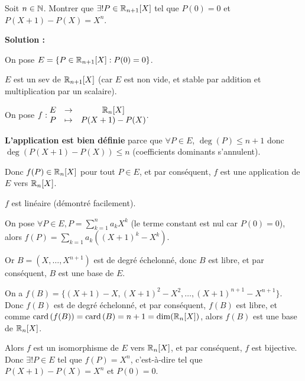 \documentclass[12pt, a4paper]{report}
\begin{document}
\begin{exercise}
    Soit $n \in \mathbb{N}$. Montrer que $\exists! P \in \mathbb{R}_{n+1}[X]$ tel que $P(0) = 0$ et $P(X+1) - P(X) = X^n$.

    \textbf{Solution :}

    On pose $E = \{P \in \mathbb{R}_{n+1}[X] : P(0) = 0\}$.

    $E$ est un sev de $\mathbb{R}_{n+1}[X]$ (car $E$ est non vide, et stable par addition et multiplication par un scalaire).

    On pose $f: \begin{matrix}
    E &\to &\mathbb{R}_n[X]\\
    P &\mapsto &P(X+1) - P(X)
    \end{matrix}$.

    \begin{outline}
        \1 \textbf{L'application est bien définie} parce que $\forall P \in E$, $\deg(P) \le n+1$ donc $\deg(P(X+1) - P(X)) \le n$ (coefficients dominants s'annulent).

        \1 Donc $f(P) \in \mathbb{R}_n[X]$ pour tout $P \in E$, et par conséquent, $f$ est une application de $E$ vers $\mathbb{R}_n[X]$.

        \1 $f$ est linéaire (démontré facilement).

        \1 On pose $\forall P \in E, P = \sum_{k=1}^n a_k X^k$ (le terme constant est nul car $P(0) = 0$), alors $f(P) = \sum_{k=1} a_k ((X+1)^k - X^k)$.

        \1 Or $B = (X,\dots,X^{n+1})$ est de degré échelonné, donc $B$ est libre, et par conséquent, $B$ est une base de $E$.

        \1 On a $f(B) = \{(X+1) - X, (X+1)^2 - X^2, \dots, (X+1)^{n+1} - X^{n+1}\}$. Donc $f(B)$ est de degré échelonné, et par conséquent, $f(B)$ est libre, et comme $\mathrm{card}\left(f(B)\right) = \mathrm{card}\left(B\right) = n+1 = \dim(\mathbb{R}_n[X])$, alors $f(B)$ est une base de $\mathbb{R}_n[X]$.

        \1 Alors $f$ est un isomorphisme de $E$ vers $\mathbb{R}_n[X]$, et par conséquent, $f$ est bijective. Donc $\exists! P \in E$ tel que $f(P) = X^n$, c'est-à-dire tel que $P(X+1) - P(X) = X^n$ et $P(0) = 0$.
    \end{outline}
\end{exercise}
\end{document}
